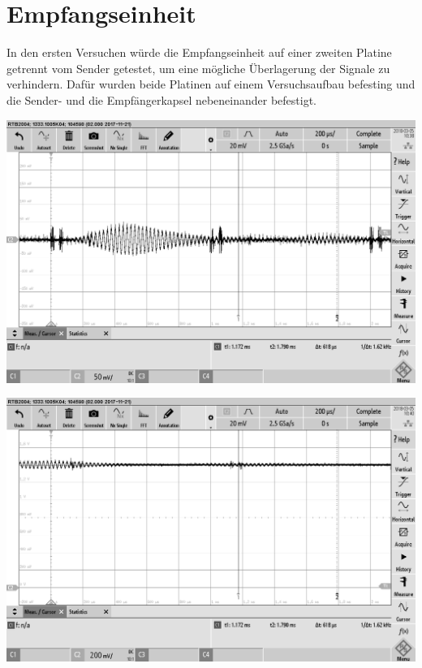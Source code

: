 \section{Empfangseinheit}
In den ersten Versuchen würde die Empfangseinheit auf einer zweiten Platine getrennt vom Sender getestet, um eine mögliche Überlagerung der Signale zu verhindern. Dafür wurden beide Platinen auf einem Versuchsaufbau befesting und die Sender- und die Empfängerkapsel nebeneinander befestigt.\\
\begin{minipage}{0.5\textwidth}
\includegraphics[width=1\textwidth, draft]{Abbildungen/Signal-Empfang.png}
\label{fig:Empfang am LS}
\end{minipage}
\begin{minipage}{0.5\textwidth}
\includegraphics[width=1\textwidth, draft]{Abbildungen/Signal-nach-der-Filterung.png}
\label{fig:Filterung}
\end{minipage}
